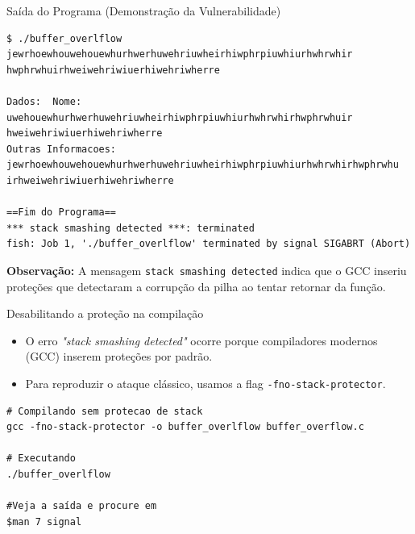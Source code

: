 \begin{frame}[fragile]{Saída do Programa (Demonstração da Vulnerabilidade)}

    \begin{verbatim}
$ ./buffer_overlflow
jewrhoewhouwehouewhurhwerhuwehriuwheirhiwphrpiuwhiurhwhrwhir
hwphrwhuirhweiwehriwiuerhiwehriwherre

Dados:  Nome: uwehouewhurhwerhuwehriuwheirhiwphrpiuwhiurhwhrwhirhwphrwhuir
hweiwehriwiuerhiwehriwherre  
Outras Informacoes: jewrhoewhouwehouewhurhwerhuwehriuwheirhiwphrpiuwhiurhwhrwhirhwphrwhu
irhweiwehriwiuerhiwehriwherre  

==Fim do Programa==
*** stack smashing detected ***: terminated
fish: Job 1, './buffer_overlflow' terminated by signal SIGABRT (Abort)
    \end{verbatim}

    \textbf{Observação:} A mensagem \texttt{stack smashing detected} indica que o GCC  inseriu proteções que detectaram a corrupção da pilha ao tentar retornar da função.
\end{frame}

\begin{frame}[fragile]{Desabilitando a proteção na compilação}
    \begin{itemize}
        \item O erro \textit{"stack smashing detected"} ocorre porque compiladores modernos (GCC) inserem proteções por padrão.
        \item Para reproduzir o ataque clássico, usamos a flag \texttt{-fno-stack-protector}.
    \end{itemize}

    \begin{verbatim}
# Compilando sem protecao de stack
gcc -fno-stack-protector -o buffer_overlflow buffer_overflow.c

# Executando
./buffer_overlflow

#Veja a saída e procure em 
$man 7 signal
    \end{verbatim}
\end{frame}

